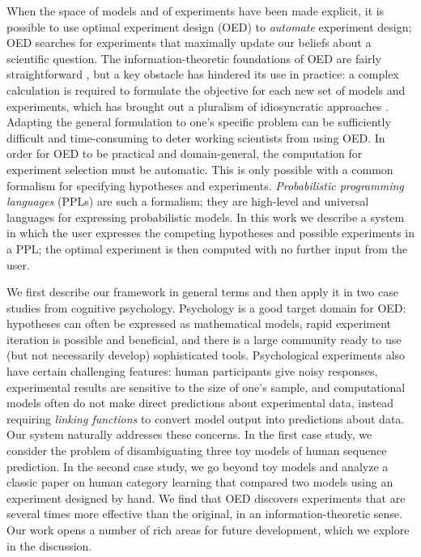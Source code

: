 \documentclass{article}
\begin{document}
When the space of models and of experiments have been made explicit, it is possible to use optimal experiment design (OED) to \emph{automate} experiment design; OED searches for experiments that maximally update our beliefs about a scientific question.
The information-theoretic foundations of OED are fairly straightforward \cite{Lindley1956}, but a key obstacle has hindered its use in practice: a complex calculation is required to formulate the objective for each new set of models and experiments, which has brought out a pluralism of idiosyncratic approaches \cite{Chaloner1995}.
Adapting the general formulation to one's specific problem can be sufficiently difficult and time-consuming to deter working scientists from using OED.
In order for OED to be practical and domain-general, the computation for experiment selection must be automatic.
This is only possible with a common formalism for specifying hypotheses and experiments.
\emph{Probabilistic programming languages} (PPLs) are such a formalism; they are high-level and universal languages for expressing probabilistic models.
In this work we describe a system in which the user expresses the competing hypotheses and possible experiments in a PPL; the optimal experiment is then computed with no further input from the user.

We first describe our framework in general terms and then apply it in two case studies from cognitive psychology.
Psychology is a good target domain for OED: hypotheses can often be expressed as mathematical models, rapid experiment iteration is possible and beneficial, and there is a large community ready to use (but not necessarily develop) sophisticated tools.
Psychological experiments also have certain challenging features: human participants give noisy responses, experimental results are sensitive to the size of one's sample, and computational models often do not make direct predictions about experimental data, instead requiring \emph{linking functions} to convert model output into predictions about data.
Our system naturally addresses these concerns.
In the first case study, we consider the problem of disambiguating three toy models of human sequence prediction.
In the second case study, we go beyond toy models and analyze a classic paper on human category learning that compared two models using an experiment designed by hand.
We find that OED discovers experiments that are several times more effective than the original, in an information-theoretic sense.
Our work opens a number of rich areas for future development, which we explore in the discussion.
\end{document}
